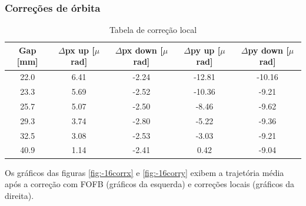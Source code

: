 \documentclass[a4paper,12pt]{article}
\begin{document}
\subsubsection{Correções de órbita}



\begin{table}[H]
\centering
\caption{Tabela de correção local}
\begin{tabular}{|c|c|c|c|c|}
\hline
Gap {[}mm{]} & $\Delta$px up {[}$\mu$rad{]} & $\Delta$px down {[}$\mu$rad{]} & $\Delta$py up {[}$\mu$rad{]} & $\Delta$py down {[}$\mu$rad{]} \\ \hline
22.0 & 6.41 & -2.24 & -12.81 & -10.16 \\ \hline
23.3 & 5.69  & -2.52 & -10.36 & -9.21 \\ \hline
25.7 & 5.07 & -2.50 & -8.46 & -9.62 \\ \hline
29.3 & 3.74  & -2.80 & -5.22 & -9.36 \\ \hline
32.5 &  3.08 & -2.53  & -3.03  & -9.21 \\ \hline
40.9 & 1.14  & -2.41 & 0.42 & -9.04 \\ \hline
\end{tabular}
\label{tab:corff16}
\end{table}


Os gráficos das figuras \ref{fig:-16corrx} e \ref{fig:-16corry} exibem a trajetória média após a correção com FOFB (gráficos da esquerda) e correções locais (gráficos da direita).
\end{document}
